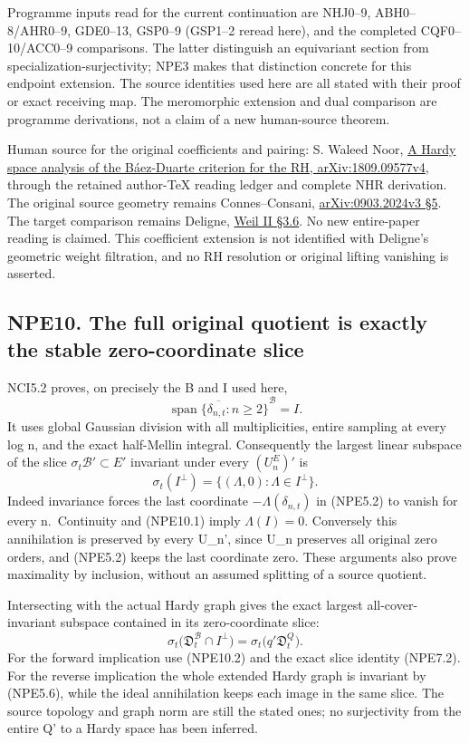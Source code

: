 Programme inputs read for the current continuation are NHJ0--9,
ABH0--8/AHR0--9, GDE0--13, GSP0--9 (GSP1--2 reread here), and the
completed CQF0--10/ACC0--9 comparisons. The latter distinguish an
equivariant section from specialization-surjectivity; NPE3 makes that
distinction concrete for this endpoint extension. The source identities
used here are all stated with their proof or exact receiving map. The
meromorphic extension and dual comparison are programme derivations, not
a claim of a new human-source theorem.

Human source for the original coefficients and pairing: S. Waleed Noor,
\href{https://arxiv.org/abs/1809.09577v4}{A Hardy space analysis of the
Báez-Duarte criterion for the RH, arXiv:1809.09577v4}, through the
retained author-TeX reading ledger and complete NHR derivation. The
original source geometry remains Connes--Consani,
\href{https://arxiv.org/abs/0903.2024v3}{arXiv:0903.2024v3 §5}. The
target comparison remains Deligne,
\href{https://numdam.org/item/PMIHES_1980__52__137_0/}{Weil II §3.6}. No
new entire-paper reading is claimed. This coefficient extension is not
identified with Deligne's geometric weight filtration, and no RH
resolution or original lifting vanishing is asserted.

\subsection{NPE10. The full original quotient is exactly the stable
zero-coordinate
slice}\label{npe10.-the-full-original-quotient-is-exactly-the-stable-zero-coordinate-slice}

NCI5.2 proves, on precisely the B and I used here, \[
\overline{\operatorname{span}\{\delta_{n,t}:n\ge2\}}^{\mathcal B}=I.
\tag{NPE10.1}
\] It uses global Gaussian division with all multiplicities, entire
sampling at every log n, and the exact half-Mellin integral.
Consequently the largest linear subspace of the slice
\(\sigma_t\mathcal B'\subset E'\) invariant under every \((U_n^E)'\) is
\[
\sigma_t(I^\perp)=\{(\Lambda,0):\Lambda\in I^\perp\}.
\tag{NPE10.2}
\] Indeed invariance forces the last coordinate
\(-\Lambda(\delta_{n,t})\) in (NPE5.2) to vanish for every n.~Continuity
and (NPE10.1) imply \(\Lambda(I)=0\). Conversely this annihilation is
preserved by every U\_n', since U\_n preserves all original zero orders,
and (NPE5.2) keeps the last coordinate zero. These arguments also prove
maximality by inclusion, without an assumed splitting of a source
quotient.

Intersecting with the actual Hardy graph gives the exact largest
all-cover-invariant subspace contained in its zero-coordinate slice: \[
\sigma_t\bigl(\mathfrak D_t^{\mathcal B}\cap I^\perp\bigr)
=\sigma_t\bigl(q'\mathfrak D_t^Q\bigr).
\tag{NPE10.3}
\] For the forward implication use (NPE10.2) and the exact slice
identity (NPE7.2). For the reverse implication the whole extended Hardy
graph is invariant by (NPE5.6), while the ideal annihilation keeps each
image in the same slice. The source topology and graph norm are still
the stated ones; no surjectivity from the entire Q' to a Hardy space has
been inferred.

